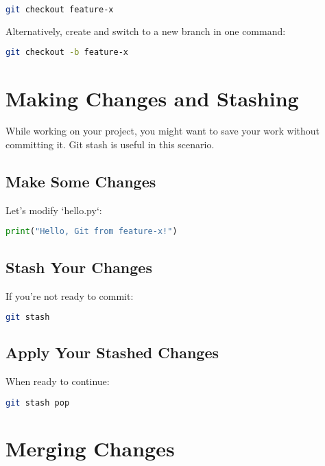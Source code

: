 \documentclass{article}
\begin{document}
\begin{lstlisting}[language=bash]
git checkout feature-x
\end{lstlisting}

Alternatively, create and switch to a new branch in one command:

\begin{lstlisting}[language=bash]
git checkout -b feature-x
\end{lstlisting}

\section{Making Changes and Stashing}

While working on your project, you might want to save your work without committing it. Git stash is useful in this scenario.

\subsection{Make Some Changes}

Let's modify `hello.py`:

\begin{lstlisting}[language=Python]
print("Hello, Git from feature-x!")
\end{lstlisting}

\subsection{Stash Your Changes}

If you're not ready to commit:

\begin{lstlisting}[language=bash]
git stash
\end{lstlisting}

\subsection{Apply Your Stashed Changes}

When ready to continue:

\begin{lstlisting}[language=bash]
git stash pop
\end{lstlisting}

\section{Merging Changes}
\end{document}
